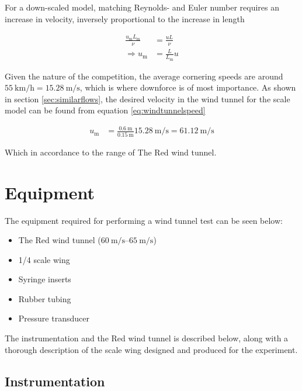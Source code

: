     For a down-scaled model, matching Reynolds- and Euler number requires an increase in velocity, inversely proportional to the increase in length 

    \begin{align}
      \frac{u_\text{m} L_\text{m}}{\nu} &= \frac{u L}{\nu} \nonumber \\
      \Rightarrow u_\text{m} &= \frac{L}{L_\text{m}} u \label{eq:windtunnelspeed}
    \end{align}

    Given the nature of the competition, the average cornering speeds are around $\SI{55}{\kilo \meter \per \hour} = \SI{15.28}{\metre\per\second}$, which is where downforce is of most importance. As shown in section \ref{sec:similarflows}, the desired velocity in the wind tunnel for the scale model can be found from equation \ref{eq:windtunnelspeed}

    \begin{align*}
      u_\text{m} &= \frac{\SI{0.6}{\metre}}{\SI{0.15}{\metre}} \SI{15.28}{\metre\per\second} = \SI{61.12}{\metre\per\second}
    \end{align*}

    Which in accordance to the range of The Red wind tunnel.

\section{Equipment}

  The equipment required for performing a wind tunnel test can be seen below:
  \begin{itemize}
    \item The Red wind tunnel ($\SIrange{60}{65}{\metre\per\second}$)
    \item 1/4 scale wing
    \item Syringe inserts
    \item Rubber tubing
    \item Pressure transducer
  \end{itemize}

  The instrumentation and the Red wind tunnel is described below, along with a thorough description of the scale wing designed and produced for the experiment.

  \subsection{Instrumentation}

